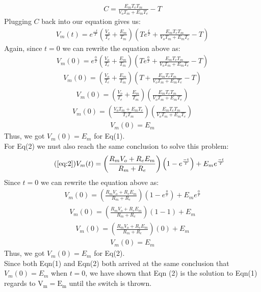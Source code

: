 \documentclass[11pt]{article}
\begin{document}
\begin{enumerate}[label=\arabic*.]
\begin{enumerate}[label=(\alph*)]
\begin{align*}
C = \frac{E_m T_e T_m} {V_o T_m + E_m T_e} - T
\end{align*}
Plugging $C$ back into our equation gives us:
\begin{align*}
V_m(t) = e^{\frac{-t} {T}} \left(\frac{V_o} {T_e} + \frac{E_m} {T_m}\right)\left(Te^{\frac{t} {T}} + \frac{E_m T_e T_m} {V_o T_m + E_m T_e} - T\right)
\end{align*}
Again, since $t = 0$ we can rewrite the equation above as:
\begin{align*}
V_m(0) = e^{\frac{0} {T}} \left(\frac{V_o} {T_e} + \frac{E_m} {T_m}\right)\left(Te^{\frac{0} {T}} + \frac{E_m T_e T_m} {V_o T_m + E_m T_e} - T\right)
\end{align*}
\begin{align*}
V_m(0) = \left(\frac{V_o} {T_e} + \frac{E_m} {T_m}\right)\left(T + \frac{E_m T_e T_m} {V_o T_m + E_m T_e} - T\right)
\end{align*}
\begin{align*}
V_m(0) = \left(\frac{V_o} {T_e} + \frac{E_m} {T_m}\right)\left(\frac{E_m T_e T_m} {V_o T_m + E_m T_e}\right)
\end{align*}
\begin{align*}
V_m(0) = \left(\frac{V_o T_m + E_m T_e} {T_e T_m}\right)\left(\frac{E_m T_e T_m} {V_o T_m + E_m T_e}\right)
\end{align*}
\begin{align*}
V_m(0) = E_m
\end{align*}
Thus, we got $V_m(0) = E_m$ for Eq(1).
\vspace*{1\baselineskip}
\\
For Eq(2) we nust also reach the same conclusion to solve this problem:
\begin{equation}
\tag{\ref{eq:2}}
V_m(t) = \left(\frac{R_m V_o + R_e E_m} {R_m + R_e}\right) \left(1 - e^{\frac{-t} {T}}\right) + E_m e^{\frac{-t} {T}}
\end{equation}
Since $t = 0$ we can rewrite the equation above as:
\begin{align*}
V_m(0) = \left(\frac{R_m V_o + R_e E_m} {R_m + R_e}\right) \left(1 - e^{\frac{0} {T}}\right) + E_m e^{\frac{0} {T}}
\end{align*}
\begin{align*}
V_m(0) = \left(\frac{R_m V_o + R_e E_m} {R_m + R_e}\right) \left(1 - 1\right) + E_m
\end{align*}
\begin{align*}
V_m(0) = \left(\frac{R_m V_o + R_e E_m} {R_m + R_e}\right) \left(0\right) + E_m
\end{align*}
\begin{align*}
V_m(0) = E_m
\end{align*}
Thus, we got $V_m(0) = E_m$ for Eq(2).
\vspace*{1\baselineskip}
\\
Since both Eqn(1) and Eqn(2) both arrived at the same conclusion that $V_m(0) = E_m$ when $t = 0$, we have shown that Eqn (2) is the solution to Eqn(1) regards to $\text{V}_\text{m} = \text{E}_\text{m}$ until the switch is thrown.




\end{enumerate}
\end{enumerate}
\end{document}
